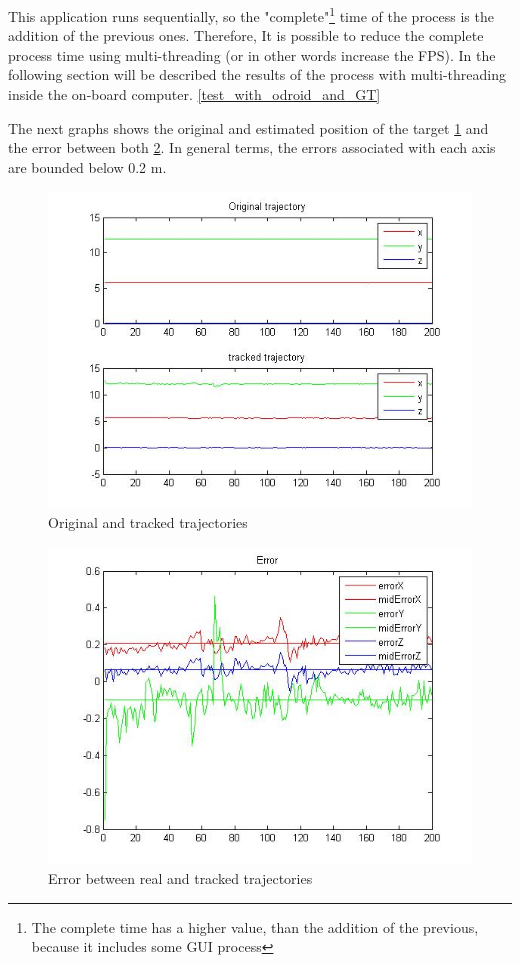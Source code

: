 	{
	\label{Reference_fps_table}
	This application runs sequentially, so the "complete"\footnote{The complete time has a higher value, than the addition of the previous, because it includes some GUI process} time of the process is the addition of the previous ones. Therefore, It is possible to reduce the complete process time using multi-threading (or in other words increase the FPS). In the following section will be described the results of the process with multi-threading inside the on-board computer. \ref{test_with_odroid_and_GT}
	}
	
	The next graphs shows the original and estimated position of the target \ref{fig:trajectories_PC} and the error between both \ref{fig:errors_PC}. In general terms, the errors associated with each axis are bounded below 0.2 m.
	
	\begin{figure}[hp]
		\centering
		\includegraphics[width=0.75\linewidth]{../Images/c4/trajs}
		\caption{Original and tracked trajectories}
		\label{fig:trajectories_PC}
	\end{figure}
	
	\begin{figure}[hp]
		\centering
		\includegraphics[width=0.5\linewidth]{../Images/c4/errors}
		\caption{Error between real and tracked trajectories}
		\label{fig:errors_PC}
	\end{figure}
	
